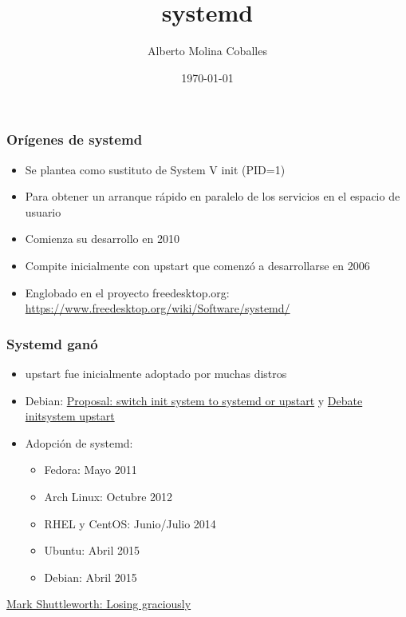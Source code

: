 \documentclass[aspectratio=169]{beamer}
\author{Alberto Molina Coballes}
\title{systemd}
\institute{IES Gonzalo Nazareno}
\date{\today}
\begin{document}
\def\braces#1{[#1]}

\begin{frame}[t,plain]
\titlepage
\end{frame}

\begin{frame}
  \frametitle{Orígenes de systemd}
  \begin{itemize}
  \item Se plantea como sustituto de System V init (PID=1)
  \item Para obtener un arranque rápido en paralelo de los servicios en el espacio de usuario
  \item Comienza su desarrollo en 2010
  \item Compite inicialmente con upstart que comenzó a desarrollarse en 2006
  \item Englobado en el proyecto freedesktop.org: \url{https://www.freedesktop.org/wiki/Software/systemd/}
  \end{itemize}
\end{frame}

\begin{frame}
  \frametitle{Systemd ganó}
  \begin{itemize}
  \item upstart fue inicialmente adoptado por muchas distros
  \item Debian: \href{https://lists.debian.org/debian-devel/2013/10/msg00651.html}{Proposal: switch init system to systemd or upstart} y \href{https://wiki.debian.org/Debate/initsystem/upstart}{Debate initsystem upstart}
  \item Adopción de systemd:
    \begin{itemize}
    \item Fedora: Mayo 2011
    \item Arch Linux: Octubre 2012
    \item RHEL y CentOS: Junio/Julio 2014
    \item Ubuntu: Abril 2015
    \item Debian: Abril 2015
    \end{itemize}
  \end{itemize}
  \href{http://www.markshuttleworth.com/archives/1316}{Mark Shuttleworth: Losing graciously}
\end{frame}
\end{document}
